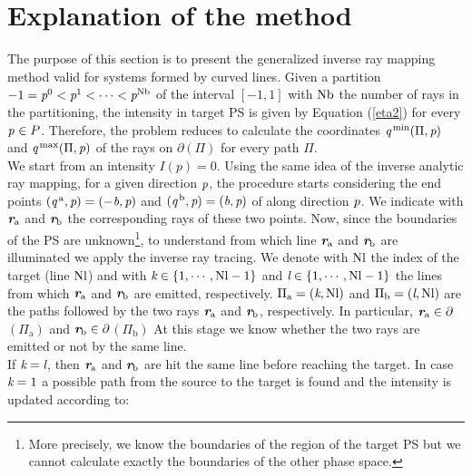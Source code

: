 \section{Explanation of the method}
The purpose of this section is to present the generalized inverse ray mapping method valid for systems formed by curved lines. 
Given a partition $-1 = \textit{p}^0<\textit{p}^1<\cdots<\textit{p}^{\textrm{Nb}}$ of the interval $[-1,1]$ with $\textrm{Nb}$ the number of rays in the partitioning, the intensity in target PS is given by Equation (\ref{eta2}) for every $\textit{p}_{\textrm{} \textit{}}\in P$.
Therefore, the problem reduces to calculate the coordinates 
$\textit{q}^{\textrm{\,min}}(\Pi, \textit{p})$ and $\textit{q}^{\textrm{\,max}}(\Pi, \textit{p})$ of the rays on $\partial$$(\Pi)$ for every path $\Pi$.\\ \indent 
We start from an intensity $I(p)=0$. Using the same idea of the inverse analytic ray mapping, for a given direction $\textit{p}$, the procedure starts considering the end points $(\textit{q}^{\,\textrm{a}}, \textit{p})= (-\textit{b}, \textit{p})$ and $(\textit{q}^{\,\textrm{b}}, \textit{p}) = (\textit{b}, \textit{p})$ of  along direction $\textit{p}$. We indicate with $\textit{\textbf{r}}_{\textrm{a}}$ and $\textit{\textbf{r}}_{\textrm{b}}$ the corresponding rays of these two points. Now, since the boundaries of the PS are unknown\footnote{More precisely, we know the boundaries of the region of the target PS but we cannot calculate exactly the boundaries of the other phase space.}, to understand from which line $\textit{\textbf{r}}_{\textrm{a}}$ and $\textit{\textbf{r}}_{\textrm{b}}$ are illuminated we apply the inverse ray tracing. We denote with $\textrm{Nl}$ the index of the target (line $\textrm{Nl}$) and with $\textit{k}\in\{1,\cdots, \textrm{Nl}-1\}$ and $\textit{l}\in\{1,\cdots, \textrm{Nl}-1\}$ the lines from which $\textit{\textbf{r}}_{\textrm{a}}$ and $\textit{\textbf{r}}_{\textrm{b}}$ are emitted, respectively. $\Pi_\textrm{a} = (\textit{k}, \textrm{Nl})$ and $\Pi_\textrm{b} = (\textit{l},\textrm{Nl})$ are the paths followed by the two rays $\textit{\textbf{r}}_{\textrm{a}}$ and $\textit{\textbf{r}}_{\textrm{b}}$, respectively. In particular, $\textit{\textbf{r}}_{\textrm{a}}\in\partial$$(\Pi_{\textrm{a}})$ and $\textit{\textbf{r}}_{\textrm{b}}\in\partial$$(\Pi_{\textrm{b}})$ At this stage we know whether the two rays are emitted or not by the same line. \\ \indent 
If $\textit{k}= \textit{l}$, then $\textit{\textbf{r}}_{\textrm{a}}$ and $\textit{\textbf{r}}_{\textrm{b}}$ are hit the same line before reaching the target. 
In case $\textit{k} = 1$ a possible path from the source to the target is found and the intensity is updated according to:
